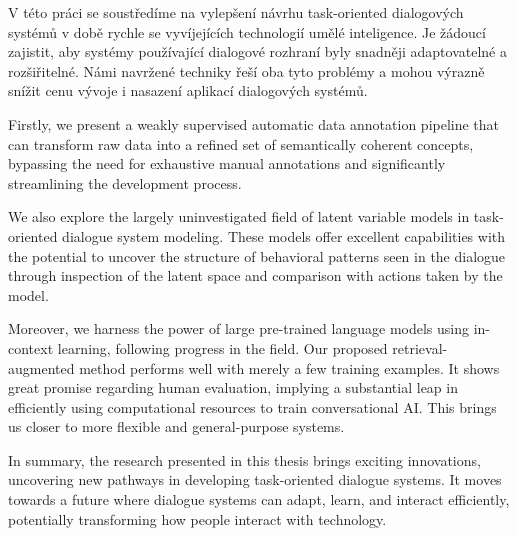 V této práci se soustředíme na vylepšení návrhu task-oriented dialogových systémů v době rychle se vyvíjejících technologií umělé inteligence.
Je žádoucí zajistit, aby systémy používající dialogové rozhraní byly snadněji adaptovatelné a rozšiřitelné.
Námi navržené techniky řeší oba tyto problémy a mohou výrazně snížit cenu vývoje i nasazení aplikací dialogových systémů.


Firstly, we present a weakly supervised automatic data annotation pipeline that can transform raw data into a refined set of semantically coherent concepts, bypassing the need for exhaustive manual annotations and significantly streamlining the development process.

We also explore the largely uninvestigated field of latent variable models in task-oriented dialogue system modeling.
These models offer excellent capabilities with the potential to uncover the structure of behavioral patterns seen in the dialogue through inspection of the latent space and comparison with actions taken by the model.

Moreover, we harness the power of large pre-trained language models using in-context learning, following progress in the field.
Our proposed retrieval-augmented method performs well with merely a few training examples.
It shows great promise regarding human evaluation, implying a substantial leap in efficiently using computational resources to train conversational AI.
This brings us closer to more flexible and general-purpose systems.

In summary, the research presented in this thesis brings exciting innovations, uncovering new pathways in developing task-oriented dialogue systems.
It moves towards a future where dialogue systems can adapt, learn, and interact efficiently, potentially transforming how people interact with technology.